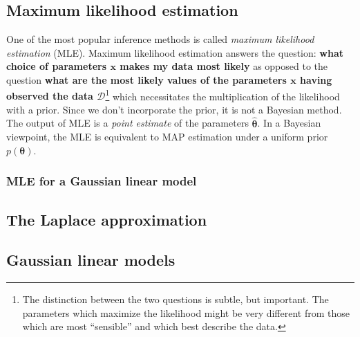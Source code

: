 \documentclass[12pt]{report}
\renewcommand{\vec}[1]{\boldsymbol{\mathbf{#1}}}
\begin{document}
\subsection{Maximum likelihood estimation}
One of the most popular inference methods is called \emph{maximum likelihood
    estimation} (MLE). Maximum likelihood estimation answers the question:
\textbf{what choice of parameters $\vec{x}$ makes my data most likely} as
opposed to the question \textbf{what are the most likely values of the
    parameters $\vec{x}$ having observed the data $\mathcal{D}$}\footnote{The
    distinction between the two questions is subtle, but important. The parameters
    which maximize the likelihood might be very different from those which are most
    ``sensible'' and which best describe the data.} which necessitates the
multiplication of the likelihood with a prior. Since we don't incorporate the
prior, it is not a Bayesian method. The output of MLE is a \emph{point
    estimate} of the parameters $\hat{\vec{\theta}}$. In a Bayesian viewpoint, the
MLE is equivalent to MAP estimation under a uniform prior $p(\vec{\theta})$.

\subsubsection{MLE for a Gaussian linear model}
\subsection{The Laplace approximation}
\subsection{Gaussian linear models}

%
\end{document}
